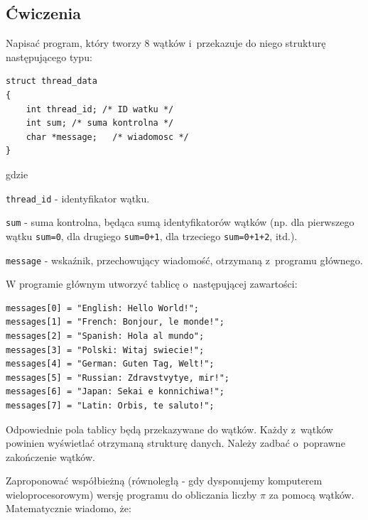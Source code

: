 \subsection{Ćwiczenia}

\begin{myenumerate}
\item Napisać program, który tworzy $8$ wątków i~przekazuje do niego strukturę następującego typu:  

\begin{lstlisting}[style=MyCStyle]
struct thread_data 
{
	int	thread_id; /* ID watku */
	int sum; /* suma kontrolna */ 
	char *message;	 /* wiadomosc */
}
\end{lstlisting}

gdzie 

\begin{myitemize}
\item \lstinline[style=MyCStyle]{thread_id} - identyfikator wątku.
\item \lstinline[style=MyCStyle]{sum} - suma kontrolna, będąca sumą identyfikatorów wątków (np. dla pierwszego wątku \mbox{\lstinline[style=MyCStyle]{sum=0}}, dla drugiego \lstinline[style=MyCStyle]{sum=0+1}, dla trzeciego \lstinline[style=MyCStyle]{sum=0+1+2}, itd.). 
\item \lstinline[style=MyCStyle]{message} - wskaźnik, przechowujący wiadomość, otrzymaną z~programu głównego.   
\end{myitemize}

W programie głównym utworzyć tablicę o~następującej zawartości: 

\begin{lstlisting}[style=MyCStyle]
messages[0] = "English: Hello World!";
messages[1] = "French: Bonjour, le monde!";
messages[2] = "Spanish: Hola al mundo";
messages[3] = "Polski: Witaj swiecie!";
messages[4] = "German: Guten Tag, Welt!"; 
messages[5] = "Russian: Zdravstvytye, mir!";
messages[6] = "Japan: Sekai e konnichiwa!";
messages[7] = "Latin: Orbis, te saluto!";
\end{lstlisting}

Odpowiednie pola tablicy będą przekazywane do wątków. Każdy z~wątków powinien wyświetlać otrzymaną strukturę danych. Należy zadbać o~poprawne zakończenie wątków. 

\item Zaproponować współbieżną (równoległą - gdy dysponujemy komputerem wieloprocesorowym) wersję programu do obliczania liczby $\pi$ za pomocą wątków. Matematycznie wiadomo, że:


\end{myenumerate}
